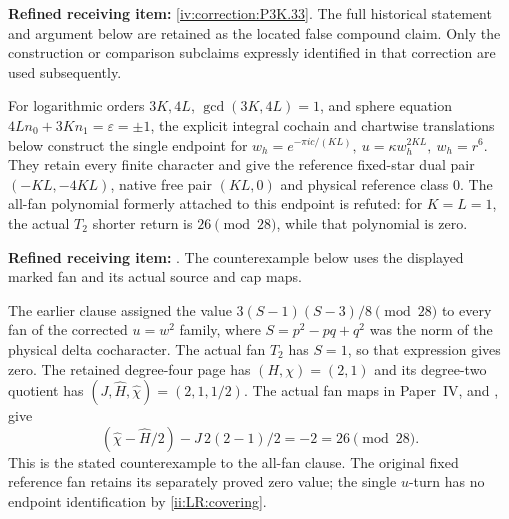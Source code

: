 \begin{theorem}\hypertarget{tag-02UE}{}\label{night:P3K.33}

\par\noindent\textbf{Refined receiving item:} \cref{iv:correction:P3K.33}. The full historical statement and argument below are retained as the located false compound claim. Only the construction or comparison subclaims expressly identified in that correction are used subsequently.

For logarithmic orders \(3K,4L\), \(\gcd(3K,4L)=1\), and
sphere equation \(4Ln_0+3Kn_1=\varepsilon=\pm1\), the explicit
integral cochain and chartwise translations below construct the
single endpoint for
\(w_h=e^{-\pi i c/(KL)},\ u=\kappa w_h^{2KL},\ w_h=r^6\).
They retain every finite character and give the reference
fixed-star dual pair \((-KL,-4KL)\), native free pair \((KL,0)\)
and physical reference class \(0\).
The all-fan polynomial formerly attached to this endpoint is
refuted: for \(K=L=1\), the actual \(T_2\) shorter return is
\(26\pmod{28}\), while that polynomial is zero.
\end{theorem}

\begin{refuted}\hypertarget{tag-02UH}{}\label{night:P3K.36}\label{stmt:P3K.36}

\par\noindent\textbf{Refined receiving item:} . The counterexample below uses the displayed marked fan and its actual source and cap maps.\par

The earlier clause assigned the value
$3(S-1)(S-3)/8\pmod {28}$ to every fan of the corrected
$u=w^2$ family, where $S=p^2-pq+q^2$ was the norm of the
physical delta cocharacter. The actual fan $T_2$ has $S=1$,
so that expression gives zero. The retained degree-four
page has $(H,\chi)=(2,1)$ and its degree-two quotient has
$(J,\widehat H,\widehat\chi)=(2,1,1/2)$.
The actual fan maps in Paper~IV,  and
, give
\[
 (\widehat\chi-\widehat H/2)-J\,2(2-1)/2
                           =-2=26\pmod {28}.
\]
This is the stated counterexample to the all-fan clause.
The original fixed reference fan retains its separately
proved zero value; the single $u$-turn has no endpoint
identification by \ref{ii:LR:covering}.
\end{refuted}


